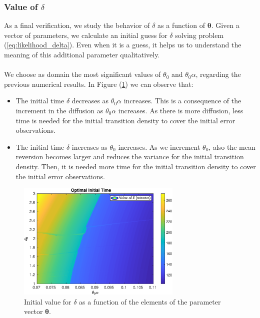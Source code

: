 \documentclass[11pt]{article}
\theoremstyle{definition}
\begin{document}
\subsubsection{Value of $\delta$}
As a final verification, we study the behavior of $\delta$ as a function of $\bm{\theta}$. Given a vector of parameters, we calculate an initial guess for $\delta$ solving problem (\ref{eq:likelihood_delta}). Even when it is a guess, it helps us to understand the meaning of this additional parameter qualitatively.\\
\quad\\
We choose as domain the most significant values of $\theta_0$ and $\theta_0\alpha$, regarding the previous numerical results. In Figure (\ref{fig:delta}) we can observe that:
\begin{itemize}
\item The initial time $\delta$ decreases as $\theta_0\alpha$ increases. This is a consequence of the increment in the diffusion as $\theta_0\alpha$ increases. As there is more diffusion, less time is needed for the initial transition density to cover the initial error observations.
\item The initial time $\delta$ increases as $\theta_0$ increases. As we increment $\theta_0$, also the mean reversion becomes larger and reduces the variance for the initial transition density. Then, it is needed more time for the initial transition density to cover the initial error observations.\end{itemize}

\begin{figure}[H]
\centering
\includegraphics[width=0.7\textwidth]{../../MATLAB_Files/Results/delta/contour_delta.eps}
\caption{Initial value for $\delta$ as a function of the elements of the parameter vector $\bm{\theta}$.}
\label{fig:delta}
\end{figure}
\end{document}
